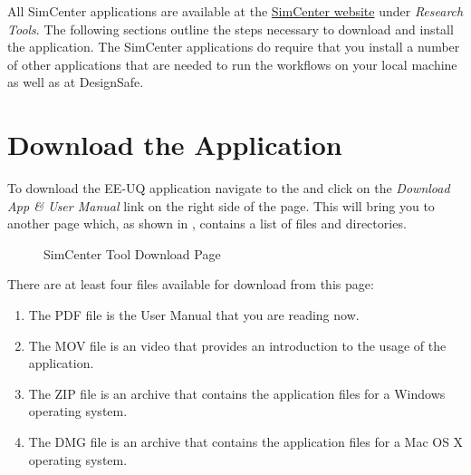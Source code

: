 All SimCenter applications are available at
the \href{https://simcenter.designsafe-ci.org/research-tools/overview/}{SimCenter
website} under \emph{Research Tools}. The following sections outline
the steps necessary to download and install the \getsoftwarename{}
application. The SimCenter applications do require that you install a
number of other applications that are needed to run the workflows on
your local machine as well as at DesignSafe. \\


\section{Download the Application}


To download the EE-UQ application navigate to
the  and click on
the \emph{Download App \& User Manual} link on the right side of the
page. This will bring you to another page which, as shown
in , contains a list of files and
directories.


\begin{figure}[!htbp]
  \caption{SimCenter Tool Download Page}
  \label{fig:app_choose_file}
\end{figure}

There are at least four files available for download from this page: 
\begin{enumerate}
    \item The PDF file is the User Manual that you are reading now.
    \item The MOV file is an video that provides an introduction to the usage of the application.
    \item The ZIP file is an archive that contains the application files for a Windows operating system.
    \item The DMG file is an archive that contains the application files for a Mac OS X operating system.
\end{enumerate}

